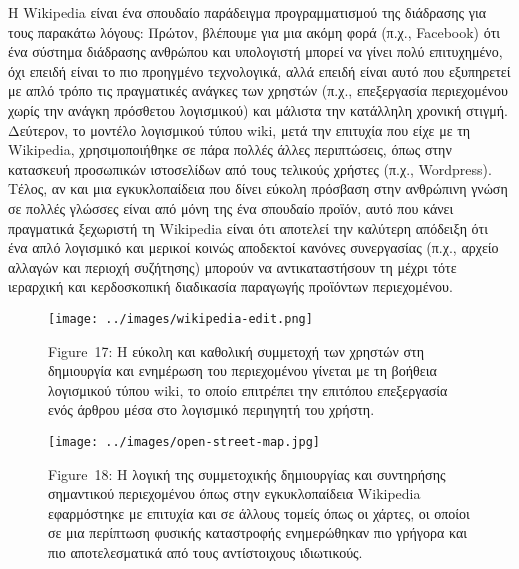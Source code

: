 \documentclass[
]{article}
\begin{document}
H Wikipedia είναι ένα σπουδαίο παράδειγμα προγραμματισμού της διάδρασης
για τους παρακάτω λόγους: Πρώτον, βλέπουμε για μια ακόμη φορά (π.χ.,
Facebook) ότι ένα σύστημα διάδρασης ανθρώπου και υπολογιστή μπορεί να
γίνει πολύ επιτυχημένο, όχι επειδή είναι το πιο προηγμένο τεχνολογικά,
αλλά επειδή είναι αυτό που εξυπηρετεί με απλό τρόπο τις πραγματικές
ανάγκες των χρηστών (π.χ., επεξεργασία περιεχομένου χωρίς την ανάγκη
πρόσθετου λογισμικού) και μάλιστα την κατάλληλη χρονική στιγμή.
Δεύτερον, το μοντέλο λογισμικού τύπου wiki, μετά την επιτυχία που είχε
με τη Wikipedia, χρησιμοποιήθηκε σε πάρα πολλές άλλες περιπτώσεις, όπως
στην κατασκευή προσωπικών ιστοσελίδων από τους τελικούς χρήστες (π.χ.,
Wordpress). Τέλος, αν και μια εγκυκλοπαίδεια που δίνει εύκολη πρόσβαση
στην ανθρώπινη γνώση σε πολλές γλώσσες είναι από μόνη της ένα σπουδαίο
προϊόν, αυτό που κάνει πραγματικά ξεχωριστή τη Wikipedia είναι ότι
αποτελεί την καλύτερη απόδειξη ότι ένα απλό λογισμικό και μερικοί κοινώς
αποδεκτοί κανόνες συνεργασίας (π.χ., αρχείο αλλαγών και περιοχή
συζήτησης) μπορούν να αντικαταστήσουν τη μέχρι τότε ιεραρχική και
κερδοσκοπική διαδικασία παραγωγής προϊόντων περιεχομένου.

\leavevmode{}%
\begin{figure}
\hypertarget{fig:wikipedia-edit}{%
\centering
\texttt{[image: ../images/wikipedia-edit.png]}
\caption{Figure~17: Η εύκολη και καθολική συμμετοχή των χρηστών στη
δημιουργία και ενημέρωση του περιεχομένου γίνεται με τη βοήθεια
λογισμικού τύπου wiki, το οποίο επιτρέπει την επιτόπου επεξεργασία ενός
άρθρου μέσα στο λογισμικό περιηγητή του
χρήστη.}\label{fig:wikipedia-edit}
}
\end{figure}

\leavevmode{}%
\begin{figure}
\hypertarget{fig:open-street-map}{%
\centering
\texttt{[image: ../images/open-street-map.jpg]}
\caption{Figure~18: Η λογική της συμμετοχικής δημιουργίας και συντηρήσης
σημαντικού περιεχομένου όπως στην εγκυκλοπαίδεια Wikipedia εφαρμόστηκε
με επιτυχία και σε άλλους τομείς όπως οι χάρτες, οι οποίοι σε μια
περίπτωση φυσικής καταστροφής ενημερώθηκαν πιο γρήγορα και πιο
αποτελεσματικά από τους αντίστοιχους
ιδιωτικούς.}\label{fig:open-street-map}
}
\end{figure}
\end{document}

